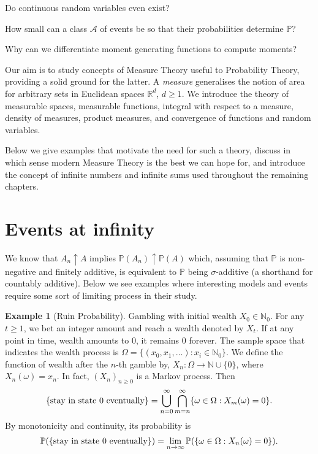 \documentclass[
]{book}
\newcommand{\N}{\mathbb{N}}
\newcommand{\Pb}{\mathbb{P}}
\newcommand{\cA}{\mathcal{A}}
\renewcommand*{\geq}{\geqslant}
\theoremstyle{definition}
\theoremstyle{definition}
\newtheorem{example}{Example}[chapter]
\theoremstyle{definition}
\theoremstyle{definition}
\theoremstyle{remark}
\begin{document}
Do continuous random variables even exist?

How small can a class \(\cA\) of events be so that their probabilities
determine \(\Pb\)?

Why can we differentiate moment generating functions to compute moments?

Our aim is to study concepts of Measure Theory useful to Probability
Theory, providing a solid ground for the latter. A \emph{measure} generalises
the notion of area for arbitrary sets in Euclidean spaces
\(\mathbb{R}^d\), \(d \geq 1\). We introduce the theory of measurable
spaces, measurable functions, integral with respect to a measure,
density of measures, product measures, and convergence of functions and
random variables.

Below we give examples that motivate the need for such a theory, discuss
in which sense modern Measure Theory is the best we can hope for, and
introduce the concept of infinite numbers and infinite sums used
throughout the remaining chapters.

\hypertarget{sub:eventsinfty}{%
\section{Events at infinity}\label{sub:eventsinfty}}

We know that \(A_n \uparrow A\) implies \(\Pb(A_n) \uparrow \Pb(A)\) which,
assuming that \(\Pb\) is non-negative and finitely additive, is equivalent
to \(\Pb\) being \(\sigma\)-additive (a shorthand for countably additive).
Below we see examples where interesting models and events require some
sort of limiting process in their study.

\begin{example}[Ruin Probability]
Gambling with initial wealth \(X_0 \in \mathbb{N}_0\). For any \(t \geq 1\),
we bet an integer amount and reach a wealth denoted by \(X_t\). If at any
point in time, wealth amounts to \(0\), it remains \(0\) forever. The sample
space that indicates the wealth process is
\(\Omega = \{(x_0, x_1, \dots): x_i \in \N_0 \}\). We define the function
of wealth after the \(n\)-th gamble by,
\(X_n : \Omega \to \mathbb{N}\cup\{0\}\), where \(X_n(\omega) = x_n\). In
fact, \((X_n)_{n \geq 0}\) is a Markov process. Then
\[\{ \text{stay in state $ 0 $ eventually} \}
= \bigcup_{n=0}^{\infty}\bigcap_{m = n}^{\infty}\{\omega \in \Omega: X_m(\omega) = 0\}.\]
By monotonicity and continuity, its probability is \[\Pb(
\{ \text{stay in state $ 0 $ eventually} \}
)
=
\lim_{n\to\infty}
\Pb(\{\omega \in \Omega: X_n(\omega) = 0\})
 .\]
\end{example}
\end{document}
